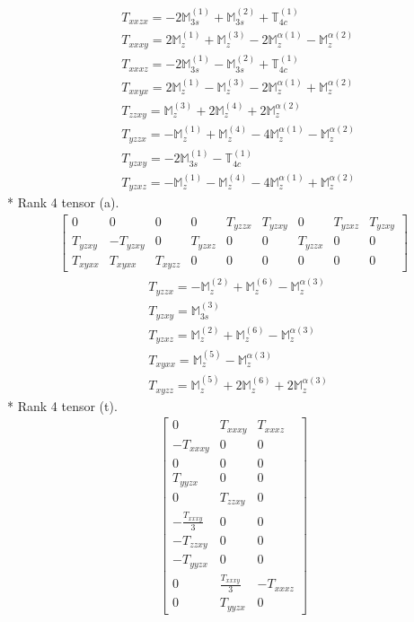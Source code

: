 \documentclass[fleqn,8pt,landscape]{jsarticle}
\begin{document}
\begin{align*}
& T_{xxzx} = - 2 \mathbb{M}_{3s}^{(1)} + \mathbb{M}_{3s}^{(2)} + \mathbb{T}_{4c}^{(1)} \\
& T_{xxxy} = 2 \mathbb{M}_{z}^{(1)} + \mathbb{M}_{z}^{(3)} - 2 \mathbb{M}_{z}^{\alpha(1)} - \mathbb{M}_{z}^{\alpha(2)} \\
& T_{xxxz} = - 2 \mathbb{M}_{3s}^{(1)} - \mathbb{M}_{3s}^{(2)} + \mathbb{T}_{4c}^{(1)} \\
& T_{xxyx} = 2 \mathbb{M}_{z}^{(1)} - \mathbb{M}_{z}^{(3)} - 2 \mathbb{M}_{z}^{\alpha(1)} + \mathbb{M}_{z}^{\alpha(2)} \\
& T_{zzxy} = \mathbb{M}_{z}^{(3)} + 2 \mathbb{M}_{z}^{(4)} + 2 \mathbb{M}_{z}^{\alpha(2)} \\
& T_{yzzx} = - \mathbb{M}_{z}^{(1)} + \mathbb{M}_{z}^{(4)} - 4 \mathbb{M}_{z}^{\alpha(1)} - \mathbb{M}_{z}^{\alpha(2)} \\
& T_{yzxy} = - 2 \mathbb{M}_{3s}^{(1)} - \mathbb{T}_{4c}^{(1)} \\
& T_{yzxz} = - \mathbb{M}_{z}^{(1)} - \mathbb{M}_{z}^{(4)} - 4 \mathbb{M}_{z}^{\alpha(1)} + \mathbb{M}_{z}^{\alpha(2)}
\end{align*}
* Rank 4 tensor (a).
\begin{align*}
\begin{bmatrix} 0 & 0 & 0 & 0 & T_{yzzx} & T_{yzxy} & 0 & T_{yzxz} & T_{yzxy} \\ T_{yzxy} & - T_{yzxy} & 0 & T_{yzxz} & 0 & 0 & T_{yzzx} & 0 & 0 \\ T_{xyxx} & T_{xyxx} & T_{xyzz} & 0 & 0 & 0 & 0 & 0 & 0 \end{bmatrix}
\end{align*}
\begin{align*}
& T_{yzzx} = - \mathbb{M}_{z}^{(2)} + \mathbb{M}_{z}^{(6)} - \mathbb{M}_{z}^{\alpha(3)} \\
& T_{yzxy} = \mathbb{M}_{3s}^{(3)} \\
& T_{yzxz} = \mathbb{M}_{z}^{(2)} + \mathbb{M}_{z}^{(6)} - \mathbb{M}_{z}^{\alpha(3)} \\
& T_{xyxx} = \mathbb{M}_{z}^{(5)} - \mathbb{M}_{z}^{\alpha(3)} \\
& T_{xyzz} = \mathbb{M}_{z}^{(5)} + 2 \mathbb{M}_{z}^{(6)} + 2 \mathbb{M}_{z}^{\alpha(3)}
\end{align*}
* Rank 4 tensor (t).
\begin{align*}
\begin{bmatrix} 0 & T_{xxxy} & T_{xxxz} \\ - T_{xxxy} & 0 & 0 \\ 0 & 0 & 0 \\ T_{yyzx} & 0 & 0 \\ 0 & T_{zzxy} & 0 \\ - \frac{T_{xxxy}}{3} & 0 & 0 \\ - T_{zzxy} & 0 & 0 \\ - T_{yyzx} & 0 & 0 \\ 0 & \frac{T_{xxxy}}{3} & - T_{xxxz} \\ 0 & T_{yyzx} & 0 \end{bmatrix}
\end{align*}
\end{document}
